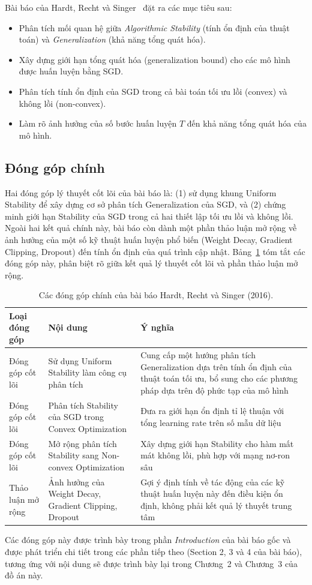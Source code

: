 Bài báo của Hardt, Recht và Singer~\cite{hardt2016train} đặt ra các mục tiêu sau:
\begin{itemize}
    \item Phân tích mối quan hệ giữa \textit{Algorithmic Stability} (tính ổn định của thuật toán) và \textit{Generalization} (khả năng tổng quát hóa).
    \item Xây dựng giới hạn tổng quát hóa (generalization bound) cho các mô hình được huấn luyện bằng SGD.
    \item Phân tích tính ổn định của SGD trong cả bài toán tối ưu lồi (convex) và không lồi (non-convex).
    \item Làm rõ ảnh hưởng của số bước huấn luyện $T$ đến khả năng tổng quát hóa của mô hình.
\end{itemize}

\subsection{Đóng góp chính}

Hai đóng góp lý thuyết cốt lõi của bài báo là: (1) sử dụng khung Uniform Stability để xây dựng cơ sở phân tích Generalization của SGD, và (2) chứng minh giới hạn Stability của SGD trong cả hai thiết lập tối ưu lồi và không lồi. Ngoài hai kết quả chính này, bài báo còn dành một phần thảo luận mở rộng về ảnh hưởng của một số kỹ thuật huấn luyện phổ biến (Weight Decay, Gradient Clipping, Dropout) đến tính ổn định của quá trình cập nhật. Bảng~\ref{tab:donggop} tóm tắt các đóng góp này, phân biệt rõ giữa kết quả lý thuyết cốt lõi và phần thảo luận mở rộng.

\begin{table}[H]
\centering
\caption{Các đóng góp chính của bài báo Hardt, Recht và Singer (2016).}
\label{tab:donggop}
\begin{tabular}{|p{3.3cm}|p{5.5cm}|p{4.2cm}|}
\hline
\textbf{Loại đóng góp} & \textbf{Nội dung} & \textbf{Ý nghĩa} \\ \hline
Đóng góp cốt lõi & Sử dụng Uniform Stability làm công cụ phân tích & Cung cấp một hướng phân tích Generalization dựa trên tính ổn định của thuật toán tối ưu, bổ sung cho các phương pháp dựa trên độ phức tạp của mô hình \\ \hline
Đóng góp cốt lõi & Phân tích Stability của SGD trong Convex Optimization & Đưa ra giới hạn ổn định tỉ lệ thuận với tổng learning rate trên số mẫu dữ liệu \\ \hline
Đóng góp cốt lõi & Mở rộng phân tích Stability sang Non-convex Optimization & Xây dựng giới hạn Stability cho hàm mất mát không lồi, phù hợp với mạng nơ-ron sâu \\ \hline
Thảo luận mở rộng & Ảnh hưởng của Weight Decay, Gradient Clipping, Dropout & Gợi ý định tính về tác động của các kỹ thuật huấn luyện này đến điều kiện ổn định, không phải kết quả lý thuyết trung tâm \\ \hline
\end{tabular}
\end{table}

Các đóng góp này được trình bày trong phần \textit{Introduction} của bài báo gốc và được phát triển chi tiết trong các phần tiếp theo (Section 2, 3 và 4 của bài báo), tương ứng với nội dung sẽ được trình bày lại trong Chương~2 và Chương~3 của đồ án này.
